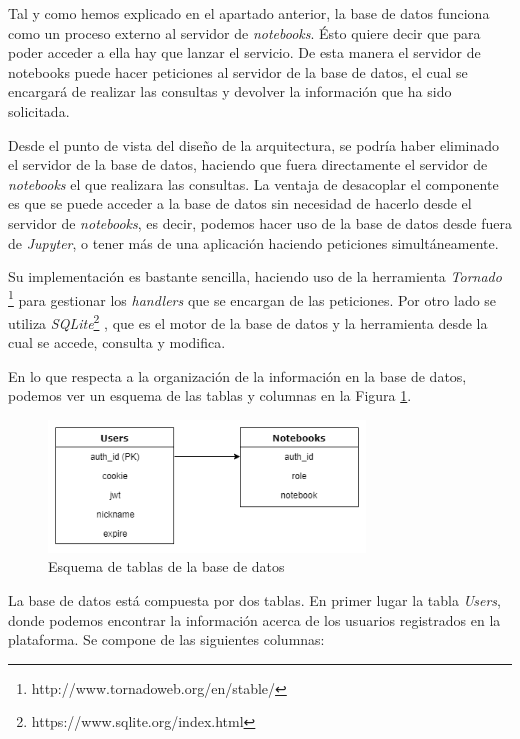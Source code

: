 \documentclass[11pt,spanish,listoffigures]{tfgetsinf}
\begin{document}
Tal y como hemos explicado en el apartado anterior, la base de datos funciona como un proceso externo al servidor de \textit{notebooks}. Ésto quiere decir que para poder acceder a ella hay que lanzar el servicio. De esta manera el servidor de notebooks puede hacer peticiones al servidor de la base de datos, el cual se encargará de realizar las consultas y devolver la información que ha sido solicitada. 

Desde el punto de vista del diseño de la arquitectura, se podría haber eliminado el servidor de la base de datos, haciendo que fuera directamente el servidor de \textit{notebooks} el que realizara las consultas. La ventaja de desacoplar el componente es que se puede acceder a la base de datos sin necesidad de hacerlo desde el servidor de \textit{notebooks}, es decir, podemos hacer uso de la base de datos desde fuera de \textit{Jupyter}, o tener más de una aplicación haciendo peticiones simultáneamente. 

Su implementación es bastante sencilla, haciendo uso de la herramienta \textit{Tornado}  \footnote{http://www.tornadoweb.org/en/stable/} para gestionar los \textit{handlers} que se encargan de las peticiones. Por otro lado se utiliza \textit{SQLite}\footnote{https://www.sqlite.org/index.html} , que es el motor de la base de datos y la herramienta desde la cual se accede, consulta y modifica. 

En lo que respecta a la organización de la información en la base de datos, podemos ver un esquema de las tablas y columnas en la Figura \ref{fig:db-scheme}. 

\begin{figure}[h]
	\centering
  	\includegraphics[width=0.75\textwidth]{database.png}
  	\caption{Esquema de tablas de la base de datos}
  	\label{fig:db-scheme}
\end{figure}

La base de datos está compuesta por dos tablas. En primer lugar la tabla \textit{Users}, donde podemos encontrar la información acerca de los usuarios registrados en la plataforma. Se compone de las siguientes columnas:
\end{document}
